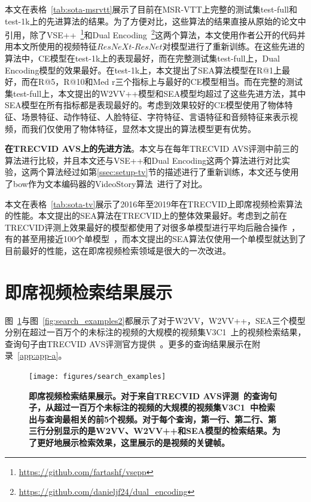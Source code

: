 本文在表格~\ref{tab:sota-msrvtt}展示了目前在MSR-VTT上完整的测试集test-full和test-1k上的先进算法的结果。为了方便对比，这些算法的结果直接从原始的论文中引用，除了VSE++~\footnote{\url{https://github.com/fartashf/vsepp}}和Dual Encoding~\footnote{\url{https://github.com/danieljf24/dual_encoding}}这两个算法，本文使用作者公开的代码并用本文所使用的视频特征$ResNeXt$-$ResNet$对模型进行了重新训练。在这些先进的算法中，CE模型在test-1k上的表现最好，而在完整测试集test-full上，Dual Encoding模型的效果最好。在test-1k上，本文提出了SEA算法模型在R@1上最好，而在R@5，R@10和Med r三个指标上与最好的CE模型相当。而在完整的测试集test-full上，本文提出的W2VV++模型和SEA模型均超过了这些先进方法，其中SEA模型在所有指标都是表现最好的。考虑到效果较好的CE模型使用了物体特征、场景特征、动作特征、人脸特征、字符特征、言语特征和音频特征来表示视频，而我们仅使用了物体特征，显然本文提出的算法模型更有优势。



\textbf{在TRECVID AVS上的先进方法}。本文与在每年TRECVID AVS评测中前三的算法进行比较，并且本文还与VSE++和Dual Encoding这两个算法进行对比实验，这两个算法经过如第\ref{ssec:setup-tv}节的描述进行了重新训练，本文还与使用了bow作为文本编码器的VideoStory算法~\cite{habibian2017video2vec}进行了对比。

本文在表格~\ref{tab:sota-tv}展示了2016年至2019年在TRECVID上即席视频检索算法的性能。本文提出的SEA算法在TRECVID上的整体效果最好。考虑到之前在TRECVID评测上效果最好的模型都使用了对很多单模型进行平均后融合操作~\cite{snoek2017university,li2018renmin,wu2019hybrid}，有的甚至用接近100个单模型~\cite{ueki2019waseda}，而本文提出的SEA算法仅使用一个单模型就达到了目前最好的性能，这在即席视频检索领域是很大的一次改进。



\section{即席视频检索结果展示}
    图~\ref{fig:search_examples}与图~\ref{fig:search_examples2}都展示了对于W2VV，W2VV++，SEA三个模型分别在超过一百万个的未标注的视频的大规模的视频集V3C1~\cite{berns2019v3c1}上的视频检索结果，查询句子由TRECVID AVS评测官方提供~\cite{awad2016trecvid,awad2017trecvid,awad2018trecvid,awad2019trecvid}。更多的查询结果展示在附录~\ref{app:app-a}。

\begin{figure}[tbh!]
    \centering
    \texttt{[image: figures/search\_examples]}
    \caption[即席视频检索结果展示]{\textbf{即席视频检索结果展示。对于来自TRECVID AVS评测~\cite{awad2016trecvid,awad2017trecvid,awad2018trecvid,awad2019trecvid}的查询句子，从超过一百万个未标注的视频的大规模的视频集V3C1~\cite{berns2019v3c1}中检索出与查询最相关的前5个视频。对于每个查询，第一行、第二行、第三行分别显示的是W2VV、W2VV++和SEA模型的检索结果。为了更好地展示检索效果，这里展示的是视频的关键帧。}}
    \label{fig:search_examples}
\end{figure}

